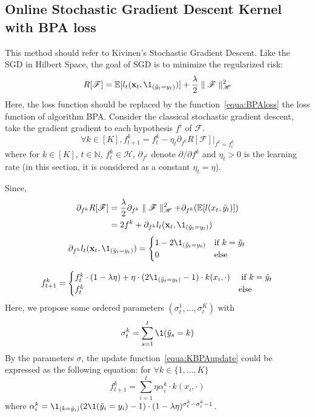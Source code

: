 \subsection{Online Stochastic Gradient Descent Kernel with BPA loss}
This method should refer to Kivinen's \cite{kivinen2004online} Stochastic Gradient Descent. Like the SGD in Hilbert Space, the goal of SGD is to minimize the regularized risk:
\[R[\mathscr{F}] = \mathbb{E}[l_t(\xt,\1_{(\ty=y_t)})] + \frac{\lambda}{2} \parallel{\mathscr{F}}\parallel^2_{\mathscr{H}}\] 
Here, the loss function should be replaced by the function~\ref{equa:BPAloss} the loss function of algorithm BPA.
Consider the classical stochastic gradient descent, take the gradient gradient to each hypothesis $f^i$ of $\mathscr{F}$.
\begin{equation}
\label{equa:kbpaSGD}
\forall k\in[K], f^k_{t+1} = f^k_t - \eta_t \partial_{f^k}R[\mathscr{F}]|_{f^k=f^k_t}
\end{equation}
where for $k\in[K]$, $t\in \mathbb{N}$, $f_t^k\in \mathscr{H}$, $\partial_{f^k}$ denote $\partial/\partial f^k$ and $\eta_t >0$ is the learning rate (in this section, it is considered as a constant $\eta_t = \eta$). 

Since,
\[
\begin{aligned}
 \partial_{f^k}R[\mathscr{F}]  & =\frac{\lambda}{2} \partial_{f^k}\parallel{\mathscr{F}}\parallel^2_{\mathscr{H}} + \partial_{f^k}(\mathbb{E}[l(x_t,\tilde{y}_t)])\\
  & = 2 f^k + \partial_{f^k} l_t(\xt,\1_{(\ty=y_t)})
\end{aligned}
\]
\[
\partial_{f^k}l_t(\xt,\1_{(\ty=y_t)}) = 
\begin{cases}
1-2\1_{(\ty = y_t)} & \text{if  } k=\ty \\
0 & \text{else}
\end{cases}
\]

\begin{equation}
\label{equa:KBPAupdate}
f_{t+1}^k =
\begin{cases}
f_t^k \cdot (1-\lambda \eta) + \eta \cdot(2\1_{(\ty=y_t)}-1)\cdot k(x_i,\cdot) & \text{ if } k = \ty \\
f_t^k & \text{else}
\end{cases}
\end{equation}
Here, we propose some ordered parameters $(\sigma_t^1,\dots,\sigma_t^K)$ with 
\begin{equation}
\label{equa:orderSigma}
\sigma_t^k = \sum_{s=1}^{t}\1(\tilde{y}_s = k)
\end{equation}
By the parameters $\sigma$, the update function~\ref{equa:KBPAupdate} could be expressed as the following equation: for $\forall k\in \{1, \dots, K\}$
\begin{equation}
\label{equa:KBPAfinal}
f_{t+1}^k = \sum_{i=1}^t \eta \alpha_i^k\cdot k(x_i,\cdot)
\end{equation}
where $\alpha_i^k = \1_{(k=\tilde{y}_i)}(2\1(\tilde{y}_i=y_i)-1)\cdot (1-\lambda\eta)^{\sigma_t^k-\sigma_i^k-1}$.

